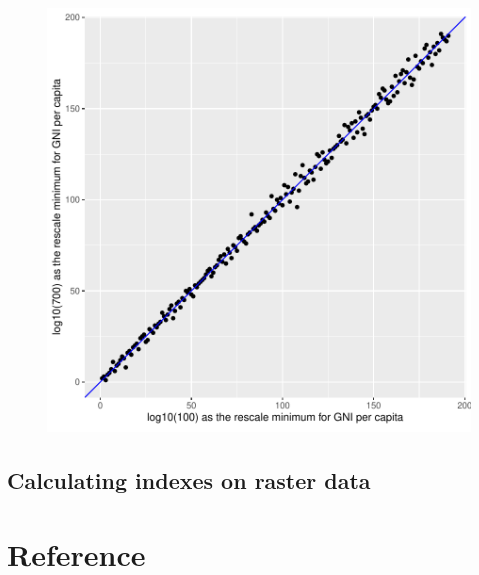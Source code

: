 \documentclass[
]{article}
\begin{document}
\begin{figure}

{\centering \includegraphics{paper_files/figure-pdf/unnamed-chunk-8-1.pdf}

}

\end{figure}

\newpage

\hypertarget{calculating-indexes-on-raster-data}{%
\subsection{Calculating indexes on raster
data}\label{calculating-indexes-on-raster-data}}

\hypertarget{reference}{%
\section*{Reference}\label{reference}}
\end{document}
